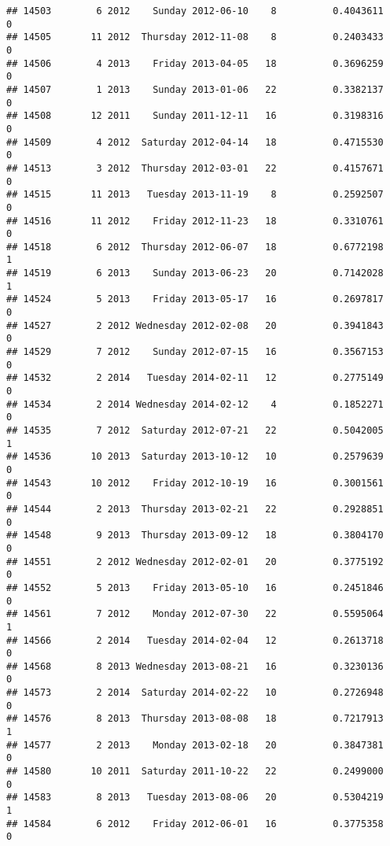\documentclass[
]{article}
\begin{document}
\begin{verbatim}
## 14503        6 2012    Sunday 2012-06-10    8          0.4043611             0
## 14505       11 2012  Thursday 2012-11-08    8          0.2403433             0
## 14506        4 2013    Friday 2013-04-05   18          0.3696259             0
## 14507        1 2013    Sunday 2013-01-06   22          0.3382137             0
## 14508       12 2011    Sunday 2011-12-11   16          0.3198316             0
## 14509        4 2012  Saturday 2012-04-14   18          0.4715530             0
## 14513        3 2012  Thursday 2012-03-01   22          0.4157671             0
## 14515       11 2013   Tuesday 2013-11-19    8          0.2592507             0
## 14516       11 2012    Friday 2012-11-23   18          0.3310761             0
## 14518        6 2012  Thursday 2012-06-07   18          0.6772198             1
## 14519        6 2013    Sunday 2013-06-23   20          0.7142028             1
## 14524        5 2013    Friday 2013-05-17   16          0.2697817             0
## 14527        2 2012 Wednesday 2012-02-08   20          0.3941843             0
## 14529        7 2012    Sunday 2012-07-15   16          0.3567153             0
## 14532        2 2014   Tuesday 2014-02-11   12          0.2775149             0
## 14534        2 2014 Wednesday 2014-02-12    4          0.1852271             0
## 14535        7 2012  Saturday 2012-07-21   22          0.5042005             1
## 14536       10 2013  Saturday 2013-10-12   10          0.2579639             0
## 14543       10 2012    Friday 2012-10-19   16          0.3001561             0
## 14544        2 2013  Thursday 2013-02-21   22          0.2928851             0
## 14548        9 2013  Thursday 2013-09-12   18          0.3804170             0
## 14551        2 2012 Wednesday 2012-02-01   20          0.3775192             0
## 14552        5 2013    Friday 2013-05-10   16          0.2451846             0
## 14561        7 2012    Monday 2012-07-30   22          0.5595064             1
## 14566        2 2014   Tuesday 2014-02-04   12          0.2613718             0
## 14568        8 2013 Wednesday 2013-08-21   16          0.3230136             0
## 14573        2 2014  Saturday 2014-02-22   10          0.2726948             0
## 14576        8 2013  Thursday 2013-08-08   18          0.7217913             1
## 14577        2 2013    Monday 2013-02-18   20          0.3847381             0
## 14580       10 2011  Saturday 2011-10-22   22          0.2499000             0
## 14583        8 2013   Tuesday 2013-08-06   20          0.5304219             1
## 14584        6 2012    Friday 2012-06-01   16          0.3775358             0

\end{verbatim}
\end{document}
